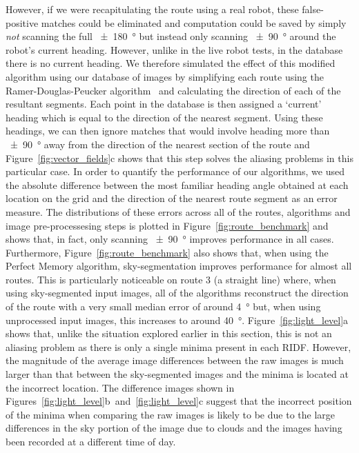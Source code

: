 \documentclass[letterpaper]{article}
\begin{document}
However, if we were recapitulating the route using a real robot, these false-positive matches could be eliminated and computation could be saved by simply \emph{not} scanning the full \SI{\pm 180}{\degree} but instead only scanning \SI{\pm 90}{\degree} around the robot's current heading.
However, unlike in the live robot tests, in the database there is no current heading.
We therefore simulated the effect of this modified algorithm using our database of images by simplifying each route using the Ramer-Douglas-Peucker algorithm~\citep{Ramer1972} and calculating the direction of each of the resultant segments.
Each point in the database is then assigned a `current' heading which is equal to the direction of the nearest segment.
Using these headings, we can then ignore matches that would involve heading more than \SI{\pm 90}{\degree} away from the direction of the nearest section of the route and Figure~\ref{fig:vector_fields}c shows that this step solves the aliasing problems in this particular case.
In order to quantify the performance of our algorithms, we used the absolute difference between the most familiar heading angle obtained at each location on the grid and the direction of the nearest route segment as an error measure.
The distributions of these errors across all of the routes, algorithms and image pre-processesing steps is plotted in Figure~\ref{fig:route_benchmark} and shows that, in fact, only scanning \SI{\pm 90}{\degree} improves performance in all cases.
Furthermore, Figure~\ref{fig:route_benchmark} also shows that, when using the Perfect Memory algorithm, sky-segmentation improves performance for almost all routes.
This is particularly noticeable on route 3 (a straight line) where, when using sky-segmented input images, all of the algorithms reconstruct the direction of the route with a very small median error of around \SI{4}{\degree} but, when using unprocessed input images, this increases to around \SI{40}{\degree}.
Figure~\ref{fig:light_level}a shows that, unlike the situation explored earlier in this section, this is not an aliasing problem as there is only a single minima present in each RIDF.
However, the magnitude of the average image differences between the raw images is much larger than that between the sky-segmented images and the minima is located at the incorrect location.
The difference images shown in Figures~\ref{fig:light_level}b~and~\ref{fig:light_level}c suggest that the incorrect position of the minima when comparing the raw images is likely to be due to the large differences in the sky portion of the image due to clouds and the images having been recorded at a different time of day.
\end{document}
